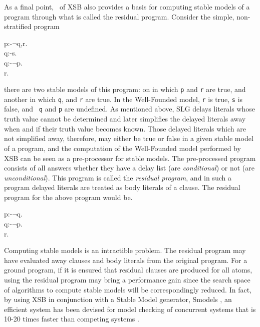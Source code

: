 As a final point, \version\ of XSB also provides a basis for computing
stable models of a program through what is called the residual
program. Consider the simple, non-stratified program 
\begin{center}
\begin{Prog}
p:-$\neg$q,r. \\
q:-s. \\
q:-$\neg$p. \\
r. \\
\end{Prog}
\end{center}
there are two stable models of this program: on in which {\tt p} and
{\tt r} are true, and another in which {\tt q}, and {\tt r} are true.
In the Well-Founded model, {\tt r} is true, {\tt s} is false, and {\tt
q} and {\tt p} are undefined.  As mentioned above, SLG delays literals
whose truth value cannot be determined and later simplifies the
delayed literals away when and if their truth value becomes known.
Those delayed literals which are not simplified away, therefore, may
either be true or false in a given stable model of a program, and the
computation of the Well-Founded model performed by XSB can be seen as
a pre-processor for stable models.  The pre-processed program consists
of all answers whether they have a delay list (are {\em conditional})
or not (are {\em unconditional}).  This program is called the {\em
residual program}, and in such a program delayed literals are treated
as body literals of a clause.  The residual program for the above
program would be. 
\begin{center}
\begin{Prog}
p:-$\neg$q. \\
q:-$\neg$p. \\
r. \\
\end{Prog}
\end{center}
Computing stable models is an intractible problem.  The residual
program may have evaluated away clauses and body literals from the
original program.  For a ground program, if it is ensured that
residual clauses are produced for all atoms, using the residual
program may bring a performance gain since the search space of
algorithms to compute stable models will be correspondingly reduced.
In fact, by using XSB in conjunction with a Stable Model generator,
Smodels \cite{NiSi96}, an efficient system has been devised for model
checking of concurrent systems that is 10-20 times faster than
competing systems \cite{RaSm97}.


